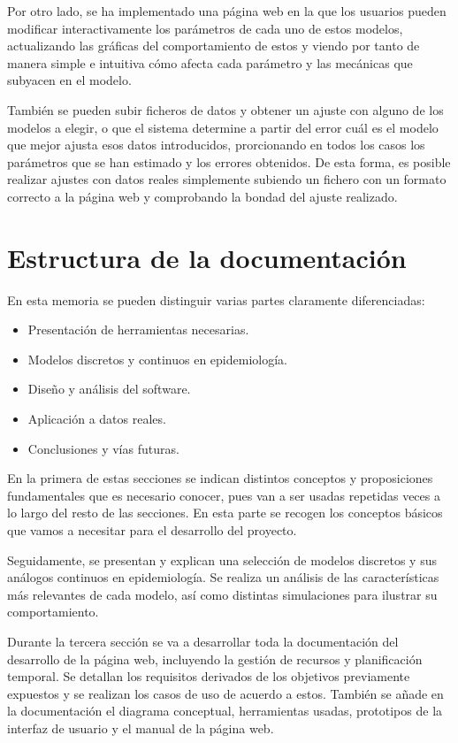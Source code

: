 Por otro lado, se ha implementado una página web en la que los usuarios pueden modificar interactivamente los parámetros de cada uno de estos modelos, actualizando las gráficas del comportamiento de estos y viendo por tanto de manera simple e intuitiva cómo afecta cada parámetro y las mecánicas que subyacen en el modelo.

También se pueden subir ficheros de datos y obtener un ajuste con alguno de los modelos a elegir, o que el sistema determine a partir del error cuál es el modelo que mejor ajusta esos datos introducidos, prorcionando en todos los casos los parámetros que se han estimado y los errores obtenidos. De esta forma, es posible realizar ajustes con datos reales simplemente subiendo un fichero con un formato correcto a la página web y comprobando la bondad del ajuste realizado.


\section{Estructura de la documentación}

En esta memoria se pueden distinguir varias partes claramente diferenciadas:

\begin{itemize}
\item Presentación de herramientas necesarias.
\item Modelos discretos y continuos en epidemiología.
\item Diseño y análisis del software.
\item Aplicación a datos reales.
\item Conclusiones y vías futuras.
\end{itemize}

En la primera de estas secciones se indican distintos conceptos y proposiciones fundamentales que es necesario conocer, pues van a ser usadas repetidas veces a lo largo del resto de las secciones. En esta parte se recogen los conceptos básicos que vamos a necesitar para el desarrollo del proyecto.

Seguidamente, se presentan y explican una selección de modelos discretos y sus análogos continuos en epidemiología. Se realiza un análisis de las características más relevantes de cada modelo, así como distintas simulaciones para ilustrar su comportamiento. 

Durante la tercera sección se va a desarrollar toda la documentación del desarrollo de la página web, incluyendo la gestión de recursos y planificación temporal. Se detallan los requisitos derivados de los objetivos previamente expuestos y se realizan los casos de uso de acuerdo a estos. También se añade en la documentación el diagrama conceptual, herramientas usadas, prototipos de la interfaz de usuario y el manual de la página web.


